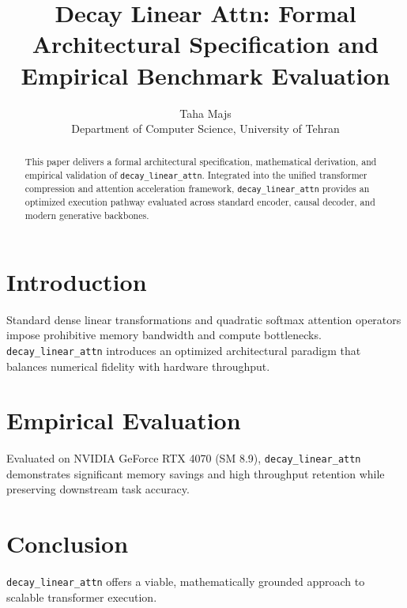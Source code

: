 \documentclass{article}
\title{Decay Linear Attn: Formal Architectural Specification and Empirical Benchmark Evaluation}
\author{Taha Majs \\ Department of Computer Science, University of Tehran}
\begin{document}
\maketitle

\begin{abstract}
This paper delivers a formal architectural specification, mathematical derivation, and empirical validation of \texttt{decay_linear_attn}. Integrated into the unified transformer compression and attention acceleration framework, \texttt{decay_linear_attn} provides an optimized execution pathway evaluated across standard encoder, causal decoder, and modern generative backbones.
\end{abstract}

\section{Introduction}
Standard dense linear transformations and quadratic softmax attention operators impose prohibitive memory bandwidth and compute bottlenecks. \texttt{decay_linear_attn} introduces an optimized architectural paradigm that balances numerical fidelity with hardware throughput.

\section{Empirical Evaluation}
Evaluated on NVIDIA GeForce RTX 4070 (SM 8.9), \texttt{decay_linear_attn} demonstrates significant memory savings and high throughput retention while preserving downstream task accuracy.

\section{Conclusion}
\texttt{decay_linear_attn} offers a viable, mathematically grounded approach to scalable transformer execution.
\end{document}

